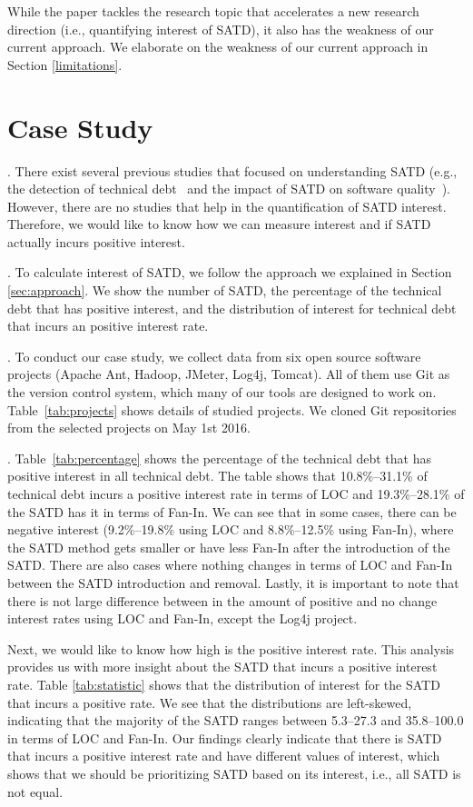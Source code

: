 \documentclass[10pt, conference]{IEEEtran}
\newcommand{\smallsection}[1]{\vspace{1mm}\noindent {\bf #1}.\hspace{2mm}}
\begin{document}
While the paper tackles the research topic that accelerates a new research direction (i.e., quantifying interest of SATD), it also has the weakness of our current approach. We elaborate on the weakness of our current approach in Section \ref{limitations}.

\section{Case Study} \label{sec:results}
\smallsection{Motivation}
There exist several previous studies that focused on understanding SATD (e.g., the detection of technical debt~\cite{Potdar2014ICSME,Zazworka2013EASE} and the impact of SATD on software quality~\cite{Wehaibi2016SANER}). However, there are no studies that help in the quantification of SATD interest. Therefore, we would like to know how we can measure interest and if SATD actually incurs positive interest.

\smallsection{Approach}
To calculate interest of SATD, we follow the approach we explained in Section \ref{sec:approach}.
We show the number of SATD, the percentage of the technical debt that has positive interest, and the distribution of interest for technical debt that incurs an positive interest rate.

\smallsection{Datasets}
To conduct our case study, we collect data from six open source software projects (Apache Ant, Hadoop, JMeter, Log4j, Tomcat). All of them use Git as the version control system, which many of our tools are designed to work on. Table~\ref{tab:projects} shows details of studied projects. We cloned Git repositories from the selected projects on May 1st 2016. 

\smallsection{Results}
Table~\ref{tab:percentage} shows the percentage of the technical debt that has positive interest in all technical debt. The table shows that 10.8\%--31.1\% of technical debt incurs a positive interest rate in terms of LOC and 19.3\%--28.1\% of the SATD has it in terms of Fan-In. We can see that in some cases, there can be negative interest (9.2\%--19.8\% using LOC and 8.8\%--12.5\% using Fan-In), where the SATD method gets smaller or have less Fan-In after the introduction of the SATD. There are also cases where nothing changes in terms of LOC and Fan-In between the SATD introduction and removal. Lastly, it is important to note that there is not large difference between in the amount of positive and no change interest rates using LOC and Fan-In, except the Log4j project. 


Next, we would like to know how high is the positive interest rate. This analysis provides us with more insight about the SATD that incurs a positive interest rate.
Table \ref{tab:statistic} shows that the distribution of interest for the SATD that incurs a positive rate. We see that the distributions are left-skewed, indicating that the majority of the SATD ranges between 5.3--27.3 and 35.8--100.0 in terms of LOC and Fan-In. Our findings clearly indicate that there is SATD that incurs a positive interest rate and have different values of interest, which shows that we should be prioritizing SATD based on its interest, i.e., all SATD is not equal.
\end{document}
